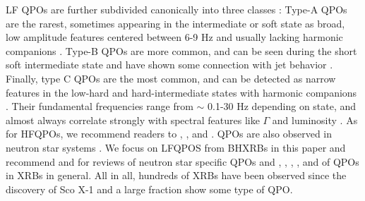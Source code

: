 \documentclass[fleqn,usenatbib,twocolumn]{mnras}%
\begin{document}
LF QPOs are further subdivided canonically into three classes \citep{casellaABC}: Type-A QPOs are the rarest, sometimes appearing in the intermediate or soft state as broad, low amplitude features centered between 6-9 Hz and usually lacking harmonic companions \citep{motta2011}. Type-B QPOs are more common, and can be seen during the short soft intermediate state and have shown some connection with jet behavior \citep{globaltypeB,garciaMendez2021}. Finally, type C QPOs are the most common, and can be detected  as narrow features in the low-hard and hard-intermediate states with harmonic companions  \citep{typeCmodel2016}. Their fundamental frequencies range from $\sim$ 0.1-30 Hz depending on state, and almost always correlate strongly with spectral features like $\Gamma$ and luminosity \citep{motta2015LotsofQPOs}. As for HFQPOs, we recommend readers to \cite{motta2011}, \cite{MendezHFQPOs2013}, and \cite{stellaVietriISCO}. QPOs are also observed in neutron star systems \citep{Belloni2002,wang2016QPOreview}. We focus on LFQPOS from BHXRBs in this paper and recommend \cite{vanDerKlis2006} and \cite{wang2016QPOreview} for reviews of neutron star specific QPOs and \cite{ingram2019}, \cite{oneHZqpo}, \cite{hectohertzKato2005}, \cite{Revnivtsev2001}, and \cite{mendezBelloni2021} of QPOs in XRBs in general. All in all, hundreds of XRBs have been observed since the discovery of Sco X-1 \citep{scox-1,lmxbCatalog,blackcat} and a large fraction show some type of QPO. 
\end{document}
